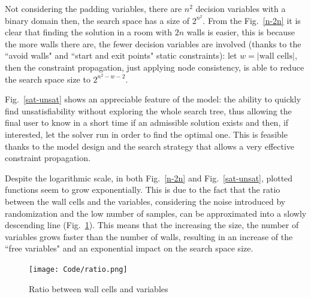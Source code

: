 \documentclass[12pt]{article}
\newcommand*{\card}[1]{\lvert #1 \rvert}
\begin{document}
Not considering the padding variables, there are $n^2$ decision variables
with a binary domain then, the search space has a size of $2^{n^2}$.
From the Fig.~\ref{n-2n} it is clear that finding the solution in a room with
$2n$
walls
is easier, this is because the more walls there are, the fewer decision
variables are involved (thanks to the ``avoid walls" and ``start and exit
points" static constraints):
let $w = \card{\text{wall cells}}$, then the constraint propagation, just
applying node consistency, is able to reduce the search space size to $2^{n^2
-w-2}$.

Fig.~\ref{sat-unsat} shows an appreciable feature of the model:
the ability to quickly find unsatisfiability without exploring the whole search
tree, thus allowing the final user to know in a short time if an admissible
solution exists and then, if interested,
let the solver run in order to find the optimal one.
This is feasible thanks to the model design and the search strategy that allows
a very effective constraint propagation.

Despite the logarithmic scale, in both Fig.~\ref{n-2n} and
Fig.~\ref{sat-unsat}, plotted functions seem to grow exponentially.
This is due to the fact that the ratio between the wall cells and the
variables, considering the noise introduced by randomization
and the low number of samples, can be approximated into a slowly
descending line (Fig.~\ref{ratio}). This means that the increasing the size,
the number of variables grows faster than the number of walls, resulting in  an
increase of the ``free variables" and an exponential impact on the search space
size.

\begin{figure}[H]
  \centering
  \texttt{[image: Code/ratio.png]}
  \caption{Ratio between wall cells and variables}
  \label{ratio}
\end{figure}
\end{document}
